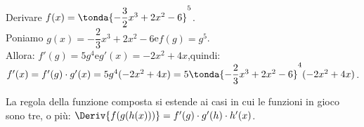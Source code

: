 \begin{esempio}
  Derivare \(f(x)=\tonda{-\dfrac{3}{2}x^3+2x^2-6}^5\).\\
  Poniamo \(g(x)=-\dfrac{2}{3}x^3+2x^2-6\)\quad e\quad \(f(g)=g^5\). \\
  Allora: 
  \(f'(g)= 5g^4\)\quad e\quad \(g'(x)=-2x^2+4x\),\quad quindi: \\
  \(f'(x)=f'(g)\cdot g'(x)=5g^4(-2x^2+4x)=
  5\tonda{-\dfrac{2}{3}x^3+2x^2-6}^4(-2x^2+4x)\).
\end{esempio}
\begin{osservazione}
 La regola della funzione composta si estende ai casi in cui le funzioni 
 in gioco sono tre, o più:
 \(\Deriv{f(g(h(x)))}=f'(g)\cdot g'(h)\cdot h'(x)\).
\end{osservazione}

\begin{comment}



\subsection{Derivata di funzioni inverse}
\label{subsec:differenziazione_derivatainverse}
 Cosa si intende per funzioni inverse? \(y=x\cdot k\) e \(x=\frac{y}{k}\), per 
esempio, sono formule inverse l'una dell'altra, ma non sono funzioni inverse 
rispetto alla stessa variabile \(x\). Le due diverse espressioni esprimono la 
stessa iperbole equilatera e lo stesso grafico, quindi hanno le stesse tangenti 
al grafico e la stessa derivata rispetto a \(x\).\\
\begin{definizione}
 Un funzione \(x=g(y)\) si dice inversa di una funzione \(y=f(x)\) se la 
composizione delle due funzioni \(f(g(y))=x\).
\end{definizione}

\begin{osservazione}
Data una qualsiasi funzione \(f(x)\), non è scontato che la sua inversa esista 
\(\forall x\) nel dominio di \(f\). Per questo, quando si cerca l'inversa di 
una funzione, succede di dover restringere il dominio di questa. Per esempio, 
\(x=g(y)=\sqrt{y}\) è inversa di \(y=f(x)=x^2\),  perché 
\(f(g(y))=(g(y))^2=(\sqrt{x})^2=x\), ma la composizione è possibile 
solo se \(x \ge 0\), mentre \(f\) vale \(\forall x\). In questo caso, quindi, 
dobbiamo considerare per \(f\) il dominio più ristretto, perchè al di fuori di 
questo l'inversa non esiste.

Una buona regola pratica per capire se \(g=f^{-1}\) esiste, è tagliare 
il grafico di \(f\) con una retta orizzontale: se la
retta incrocia il grafico di \(f\) in più punti, \(f^{-1}\) non esiste.\\
\end{osservazione}


\end{comment}
